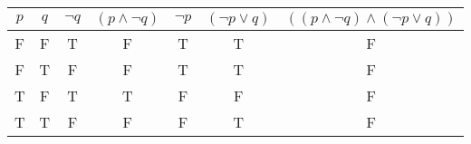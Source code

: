 \begin{tabular}{|c|c||c|c|c|c|c|}
\hline
$ p $ & $ q $ & $  \neg q $ & $ (p \wedge  \neg q) $ & $  \neg p $ & $ ( \neg p \vee q) $ & $ ((p \wedge  \neg q) \wedge ( \neg p \vee q)) $ \\
\hline
F & F & T & F & T & T & F \\
F & T & F & F & T & T & F \\
T & F & T & T & F & F & F \\
T & T & F & F & F & T & F \\
\hline
\end{tabular}
